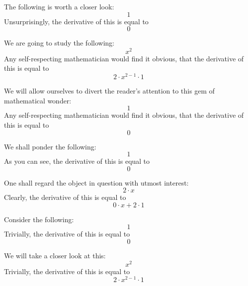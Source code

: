 \documentclass{article}
\begin{document}
The following is worth a closer look:
\begin{equation}
1 
\end{equation}
Unsurprisingly, the derivative of this is equal to
\begin{equation}
0 
\end{equation}

We are going to study the following:
\begin{equation}
x ^{2 } 
\end{equation}
Any self-respecting mathematician would find it obvious, that the derivative of this is equal to
\begin{equation}
2 \cdot x ^{2 - 1 } \cdot 1 
\end{equation}

We will allow ourselves to divert the reader's attention to this gem of mathematical wonder:
\begin{equation}
1 
\end{equation}
Any self-respecting mathematician would find it obvious, that the derivative of this is equal to
\begin{equation}
0 
\end{equation}

We shall ponder the following:
\begin{equation}
1 
\end{equation}
As you can see, the derivative of this is equal to
\begin{equation}
0 
\end{equation}

One shall regard the object in question with utmost interest:
\begin{equation}
2 \cdot x 
\end{equation}
Clearly, the derivative of this is equal to
\begin{equation}
0 \cdot x + 2 \cdot 1 
\end{equation}

Consider the following:
\begin{equation}
1 
\end{equation}
Trivially, the derivative of this is equal to
\begin{equation}
0 
\end{equation}

We will take a closer look at this:
\begin{equation}
x ^{2 } 
\end{equation}
Trivially, the derivative of this is equal to
\begin{equation}
2 \cdot x ^{2 - 1 } \cdot 1 
\end{equation}
\end{document}

